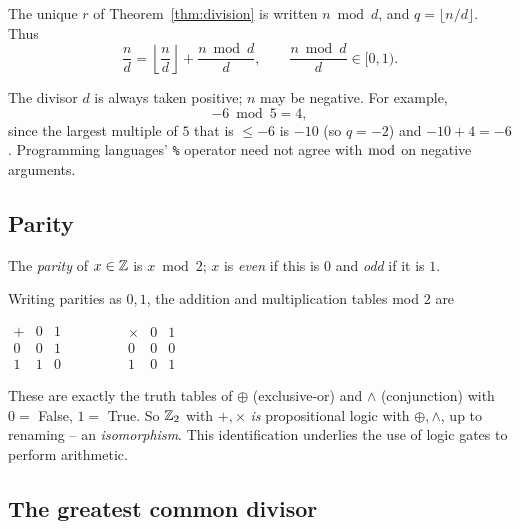 \documentclass[11pt]{article}
\begin{document}
\begin{definition}
The unique $r$ of Theorem~\ref{thm:division} is written $n\bmod d$, and $q=\lfloor n/d\rfloor$. Thus
\[
\frac nd = \left\lfloor\frac nd\right\rfloor + \frac{n\bmod d}{d}, \qquad \frac{n\bmod d}{d}\in[0,1).
\]
\end{definition}

\begin{note}
The divisor $d$ is always taken positive; $n$ may be negative. For example,
\[
-6\bmod5=4,
\]
since the largest multiple of $5$ that is $\le-6$ is $-10$ (so $q=-2$) and $-10+4=-6$. Programming languages' \texttt{\%} operator need not agree with $\bmod$ on negative arguments.
\end{note}

\subsection{Parity}
\label{sec:parity}

\begin{definition}[Parity]
The \emph{parity} of $x\in\mathbb{Z}$ is $x\bmod2$; $x$ is \emph{even} if this is $0$ and \emph{odd} if it is $1$.
\end{definition}

\begin{note}
Writing parities as $0,1$, the addition and multiplication tables mod $2$ are

\begin{center}
$
\begin{array}{c|cc}
+ & 0 & 1\\\hline
0 & 0 & 1\\
1 & 1 & 0
\end{array}
\qquad\qquad
\begin{array}{c|cc}
\times & 0 & 1\\\hline
0 & 0 & 0\\
1 & 0 & 1
\end{array}
$
\end{center}

These are exactly the truth tables of $\oplus$ (exclusive-or) and $\wedge$ (conjunction) with $0=$ False, $1=$ True. So $\mathbb{Z}_2$ with $+,\times$ \emph{is} propositional logic with $\oplus,\wedge$, up to renaming -- an \emph{isomorphism}. This identification underlies the use of logic gates to perform arithmetic.
\end{note}

\subsection{The greatest common divisor}
\label{sec:gcd}
\end{document}
